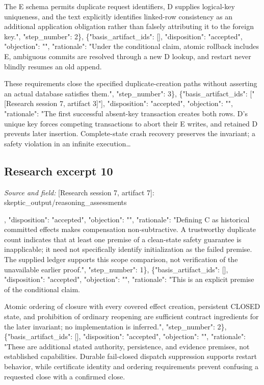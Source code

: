 \documentclass[11pt]{article}
\begin{document}
The E schema permits duplicate request identifiers, D supplies logical-key uniqueness, and the text explicitly identifies linked-row consistency as an additional application obligation rather than falsely attributing it to the foreign key.", "step\_number": 2\}, \{"basis\_artifact\_ids": [], "disposition": "accepted", "objection": "", "rationale": "Under the conditional claim, atomic rollback includes E, ambiguous commits are resolved through a new D lookup, and restart never blindly resumes an old append.

These requirements close the specified duplicate-creation paths without asserting an actual database satisfies them.", "step\_number": 3\}, \{"basis\_artifact\_ids": ["[Research session 7, artifact 3]"], "disposition": "accepted", "objection": "", "rationale": "The first successful absent-key transaction creates both rows. D's unique key forces competing transactions to abort their E writes, and retained D prevents later insertion. Complete-state crash recovery preserves the invariant; a safety violation in an infinite execution\ldots{}

\subsection{Research excerpt 10}
\textit{Source and field: }[Research session 7, artifact 7]: skeptic\_output/reasoning\_assessments\par
[\{"basis\_artifact\_ids": [], "disposition": "accepted", "objection": "", "rationale": "Defining C as historical committed effects makes compensation non-subtractive. A trustworthy duplicate count indicates that at least one premise of a clean-state safety guarantee is inapplicable; it need not specifically identify initialization as the failed premise. The supplied ledger supports this scope comparison, not verification of the unavailable earlier proof.", "step\_number": 1\}, \{"basis\_artifact\_ids": [], "disposition": "accepted", "objection": "", "rationale": "This is an explicit premise of the conditional claim.

Atomic ordering of closure with every covered effect creation, persistent CLOSED state, and prohibition of ordinary reopening are sufficient contract ingredients for the later invariant; no implementation is inferred.", "step\_number": 2\}, \{"basis\_artifact\_ids": [], "disposition": "accepted", "objection": "", "rationale": "These are additional stated authority, persistence, and evidence premises, not established capabilities. Durable fail-closed dispatch suppression supports restart behavior, while certificate identity and ordering requirements prevent confusing a requested close with a confirmed close.
\end{document}
